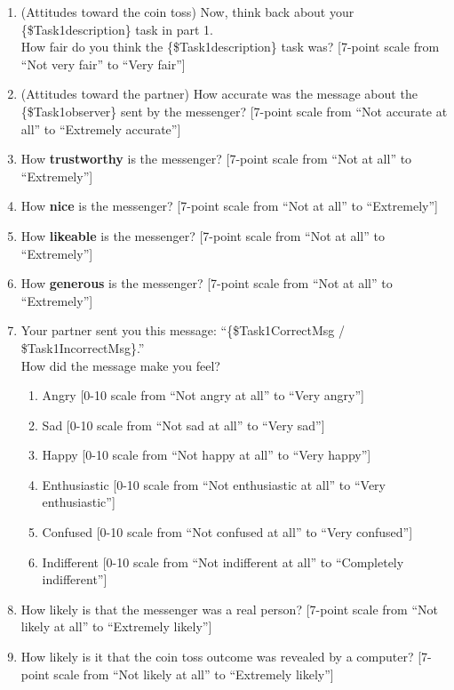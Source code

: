\begin{enumerate} 
    \item (Attitudes toward the coin toss) Now, think back about your \{\$Task1description\} task in part 1.
    \\
    How fair do you think the \{\$Task1description\} task was? [7-point scale
    from ``Not very fair'' to ``Very fair'']
    \item (Attitudes toward the partner) How accurate was the message
    about the \{\$Task1observer\} sent by the messenger? [7-point scale from ``Not
    accurate at all'' to ``Extremely accurate'']
    \item How \textbf{trustworthy} is the messenger? [7-point scale from ``Not at
    all'' to ``Extremely'']
    \item How \textbf{nice} is the messenger? [7-point scale from ``Not at all'' to
    ``Extremely'']
    \item How \textbf{likeable} is the messenger? [7-point scale from ``Not at all''
    to ``Extremely'']
    \item How \textbf{generous} is the messenger? [7-point scale from ``Not at all''
    to ``Extremely'']
    \item Your partner sent you this message: ``\{\$Task1CorrectMsg / \$Task1IncorrectMsg\}.''
    \\
    How did the message make you feel?
    \begin{enumerate}
        \item Angry [0-10 scale from ``Not angry at all'' to ``Very
        angry'']
        \item Sad [0-10 scale from ``Not sad at all'' to ``Very sad'']
        \item Happy [0-10 scale from ``Not happy at all'' to ``Very
        happy'']
        \item Enthusiastic [0-10 scale from ``Not enthusiastic at all''
        to ``Very enthusiastic'']
        \item Confused [0-10 scale from ``Not confused at all'' to
        ``Very confused'']
        \item Indifferent [0-10 scale from ``Not indifferent at all'' to
        ``Completely indifferent'']
    \end{enumerate}
    \item How likely is that the messenger was a real person? [7-point scale
    from ``Not likely at all'' to ``Extremely likely'']
    \item How likely is it that
    the coin toss outcome was revealed by a computer? [7-point scale from
    ``Not likely at all'' to ``Extremely likely'']
\end{enumerate}

